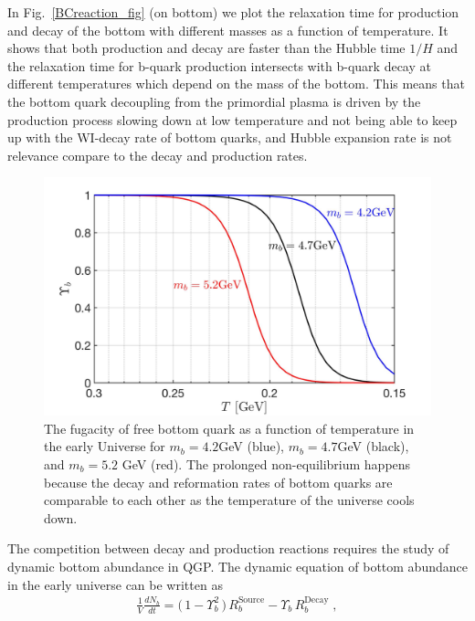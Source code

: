 \documentclass[universe,article,submit,moreauthors,pdftex,a4paper]{Definitions/mdpi}
\begin{document}
In Fig.~\ref{BCreaction_fig} (on bottom) we plot the relaxation time for production and decay of the bottom with different masses as a function of temperature. It shows that both production and decay are faster than the Hubble time $1/H$ and the relaxation time for b-quark production intersects with b-quark decay at different temperatures which depend on the mass of the bottom. This means that the bottom quark decoupling from the primordial plasma is driven by the production process slowing down at low temperature and not being able to keep up with the WI-decay rate of bottom quarks, and Hubble expansion rate is not relevance compare to the decay and production rates.
\begin{figure} [t]
\centering
\includegraphics[width=\linewidth]{BquarkFugacity.jpg}
\caption{The fugacity of free bottom quark as a function of temperature in the early Universe for $m_b = 4.2$GeV (blue), $m_b = 4.7 $GeV (black), and $m_b = 5.2$ GeV (red). The prolonged non-equilibrium happens because the decay and reformation rates of bottom quarks are comparable to each other as the temperature of the universe cools down. }
\label{UpsilonBottom_fig}
\end{figure}
The competition between decay and production reactions requires the study of dynamic bottom abundance in QGP. The dynamic equation of bottom abundance in the early universe can be written as
\begin{align}
\label{Bquark_eq}
\frac{1}{V}\frac{dN_b}{dt}=\big(\,1-\Upsilon^2_{b}\,\big)\,R^{\mathrm{Source}}_{b}-\Upsilon_b\,R^{\mathrm{Decay}}_{b}\;,
\end{align}
\end{document}
